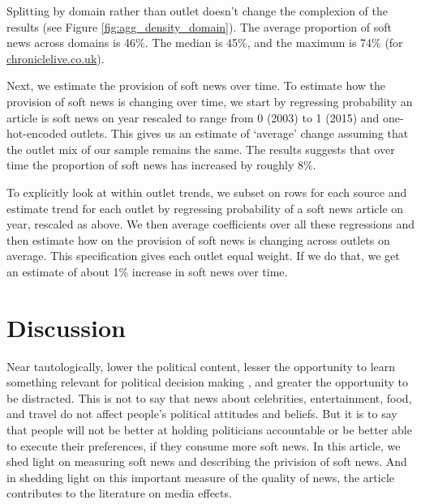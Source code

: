\documentclass[12pt, letterpaper]{article}
\begin{document}
Splitting by domain rather than outlet doesn't change the complexion of the results (see Figure \ref{fig:agg_density_domain}). The average proportion of soft news across domains is 46\%. The median is 45\%, and the maximum is 74\% (for \url{chroniclelive.co.uk}).

Next, we estimate the provision of soft news over time. To estimate how the provision of soft news is changing over time, we start by regressing probability an article is soft news on year rescaled to range from 0 (2003) to 1 (2015) and one-hot-encoded outlets. This gives us an estimate of `average' change assuming that the outlet mix of our sample remains the same. The results suggests that over time the proportion of soft news has increased by roughly 8\%. 

To explicitly look at within outlet trends, we subset on rows for each source and estimate trend for each outlet by regressing probability of a soft news article on year, rescaled as above. We then average coefficients over all these regressions and then estimate how on the provision of soft news is changing across outlets on average. This specification gives each outlet equal weight. If we do that, we get an estimate of about 1\% increase in soft news over time.

\section*{Discussion}
Near tautologically, lower the political content, lesser the opportunity to learn something relevant for political decision making \citep{prior2003, curran2009media}, and greater the opportunity to be distracted. This is not to say that news about celebrities, entertainment, food, and travel do not affect people's political attitudes and beliefs. But it is to say that people will not be better at holding politicians accountable or be better able to execute their preferences, if they consume more soft news. In this article, we shed light on measuring soft news and describing the privision of soft news. And in shedding light on this important measure of the quality of news, the article contributes to the literature on media effects.

\clearpage
\normalfont
\normalsize
\doublespace%

  

\clearpage
\appendix
\renewcommand{\thesection}{SI \arabic{section}}
\setcounter{table}{0}\renewcommand\thetable{\thesection.\arabic{table}}  
\setcounter{figure}{0}\renewcommand\thefigure{\thesection.\arabic{figure}}
\end{document}
